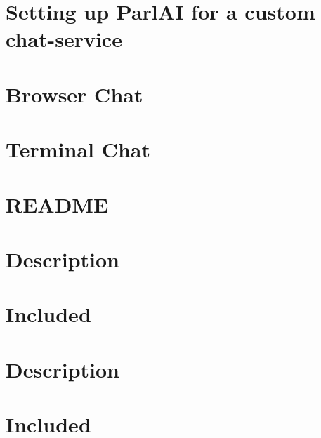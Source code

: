 \documentclass[twoside]{book}
\newcommand{\+}{\discretionary{\mbox{\scriptsize$\hookleftarrow$}}{}{}}
\begin{document}
\chapter{Setting up Parl\+AI for a custom chat-\/service}
\label{md_parlai_chat_service_README}

\chapter{Browser Chat}
\label{md_parlai_chat_service_services_browser_chat_README}

\chapter{Terminal Chat}
\label{md_parlai_chat_service_services_terminal_chat_README}

\chapter{R\+E\+A\+D\+ME}
\label{md_parlai_core_README}

\chapter{Description}
\label{md_parlai_mturk_core_dev_react_server_README}

\chapter{Included}
\label{md_parlai_mturk_core_dev_README}

\chapter{Description}
\label{md_parlai_mturk_core_legacy_2018_react_server_README}

\chapter{Included}
\label{md_parlai_mturk_core_legacy_2018_README}

\end{document}
